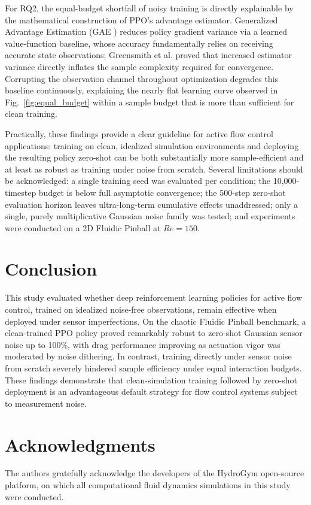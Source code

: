 \documentclass[11pt,a4paper]{article}
\begin{document}
For RQ2, the equal-budget shortfall of noisy training is directly explainable by the mathematical construction of PPO's advantage estimator. Generalized Advantage Estimation (GAE \cite{schulman2016gae}) reduces policy gradient variance via a learned value-function baseline, whose accuracy fundamentally relies on receiving accurate state observations; Greensmith et al. \cite{greensmith2004} proved that increased estimator variance directly inflates the sample complexity required for convergence. Corrupting the observation channel throughout optimization degrades this baseline continuously, explaining the nearly flat learning curve observed in Fig.~\ref{fig:equal_budget} within a sample budget that is more than sufficient for clean training.

Practically, these findings provide a clear guideline for active flow control applications: training on clean, idealized simulation environments and deploying the resulting policy zero-shot can be both substantially more sample-efficient and at least as robust as training under noise from scratch. Several limitations should be acknowledged: a single training seed was evaluated per condition; the 10,000-timestep budget is below full asymptotic convergence; the 500-step zero-shot evaluation horizon leaves ultra-long-term cumulative effects unaddressed; only a single, purely multiplicative Gaussian noise family was tested; and experiments were conducted on a 2D Fluidic Pinball at $Re=150$.

\section{Conclusion}
\label{sec:conclusion}

This study evaluated whether deep reinforcement learning policies for active flow control, trained on idealized noise-free observations, remain effective when deployed under sensor imperfections. On the chaotic Fluidic Pinball benchmark, a clean-trained PPO policy proved remarkably robust to zero-shot Gaussian sensor noise up to 100\%, with drag performance improving as actuation vigor was moderated by noise dithering. In contrast, training directly under sensor noise from scratch severely hindered sample efficiency under equal interaction budgets. These findings demonstrate that clean-simulation training followed by zero-shot deployment is an advantageous default strategy for flow control systems subject to measurement noise.

\section*{Acknowledgments}
The authors gratefully acknowledge the developers of the HydroGym open-source platform, on which all computational fluid dynamics simulations in this study were conducted.
\end{document}
